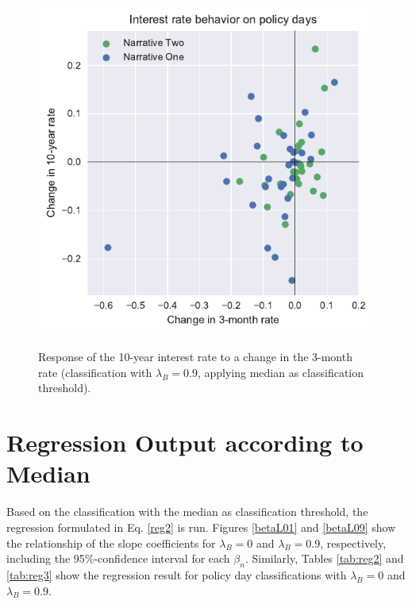 \documentclass[11pt,a4paper,english,oneside]{book}
\numberwithin{equation}{chapter}
\begin{document}
\begin{figure}
	\caption{Response of the 10-year interest rate to a change in the 3-month rate (classification with $\lambda_B=0.9$, applying median as classification threshold).}
	\centering
	\includegraphics[scale=1]{Images/ChangePlotmod_L0_9.pdf}
	\label{Change02mod_L09}
\end{figure}

\section{Regression Output according to Median}\label{AppendixE2}

Based on the classification with the median as classification threshold, the regression formulated in Eq. \ref{reg2} is run. Figures \ref{betaL01} and \ref{betaL09} show the relationship of the slope coefficients for $\lambda_B=0$ and $\lambda_B=0.9$, respectively, including the 95\%-confidence interval for each $\beta_n$. Similarly, Tables \ref{tab:reg2} and \ref{tab:reg3}  show the regression result for policy day classifications with $\lambda_B=0$ and $\lambda_B=0.9$.
\end{document}
